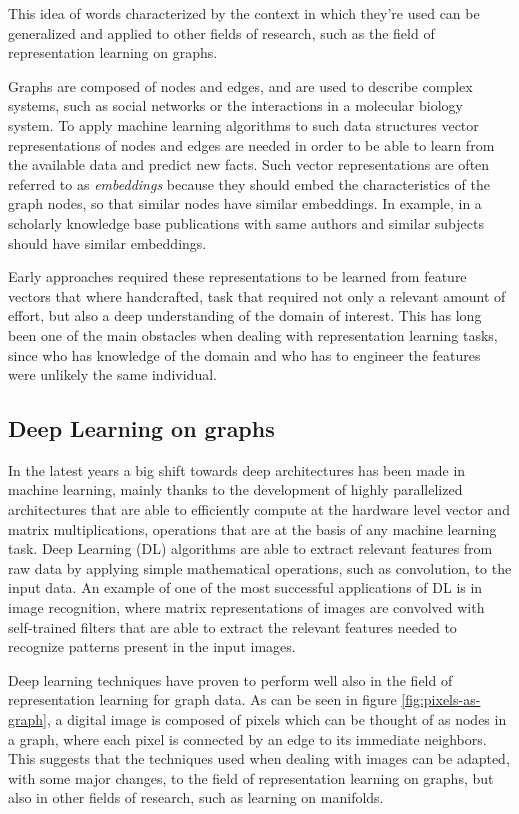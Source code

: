 \documentclass[%
    corpo=13.5pt,
    twoside,
    oldstyle,
    tipotesi=magistrale,
    greek,
    evenboxes
]{toptesi}
\begin{document}
This idea of words characterized by the context in which they're used
can be generalized and applied to other fields of research, such as
the field of representation learning on graphs.

Graphs are composed of nodes and edges, and are used to describe complex
systems, such as social networks or the interactions in a molecular biology
system. To apply machine learning algorithms to such data structures
vector representations of nodes and edges are needed in order
to be able to learn from the available data and predict new facts.
Such vector representations are often referred to as \emph{embeddings} because
they should embed the characteristics of the graph nodes, so that similar nodes
have similar embeddings. In example, in a scholarly knowledge base publications
with same authors and similar subjects should have similar embeddings.

Early approaches required these representations to be learned from feature
vectors that where handcrafted, task that required not
only a relevant amount of effort, but also a deep understanding of the domain
of interest. This has long been one of the main obstacles when dealing with
representation learning tasks, since who has knowledge of the domain and who
has to engineer the features were unlikely the same individual.


\subsection{Deep Learning on graphs}

In the latest years a big shift towards deep architectures has been made
in machine learning, mainly thanks to the development of highly
parallelized architectures that are able to efficiently compute
at the hardware level vector and matrix multiplications, operations that
are at the basis of any machine learning task.
Deep Learning (DL) algorithms are able to extract relevant features from
raw data by applying simple mathematical operations, such as convolution, to
the input data.
An example of one of the most successful applications of DL is in
image recognition, where matrix representations of images are
convolved with self-trained filters that are able to
extract the relevant features needed to recognize patterns present
in the input images.

Deep learning techniques have proven to perform well also in the field of
representation learning for graph data.
As can be seen in figure \ref{fig:pixels-as-graph}, a digital image
is composed of pixels which can be thought of as nodes in a graph, where
each pixel is connected by an edge to its immediate neighbors. This suggests
that the techniques used when dealing with images can be adapted, with
some major changes, to the field of representation learning on graphs, but
also in other fields of research, such as learning on manifolds.
\end{document}
